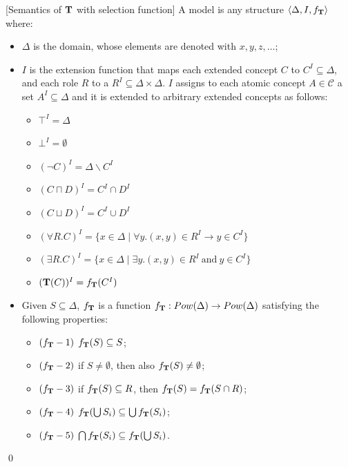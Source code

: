 \documentclass[a4paper, 11pt, oneside]{duthesis}
\newcommand{\tip}{{\bf T}}
\newcommand{\vuoto} {\emptyset}
\newcommand{\nott} {\lnot}
\newcommand{\tc} {\mid}
\newcommand{\imp} {\rightarrow}
\newenvironment{definition}
{\begin{defi} \rm}{\qed \end{defi}}
\newenvironment{definition}
{\begin{defi} \rm}{\qed \end{defi}}
\newtheorem{definition}{Definition}
\newcounter{posu}
\newtheorem{definition}[posu]{Definition}
\begin{document}
\begin{definition}[Semantics of $\tip$ with selection function]\label{Semantics with f_tip} A model is any structure $\langle \Delta, I, f_\tip \rangle$ where:

\begin{itemize}
\item $\Delta$ is the domain, whose elements are denoted with $x, y, z, \dots$;
\item $I$ is the extension function that maps each extended concept $C$ to $C^I \subseteq \Delta$, and each role $R$ to a $R^I \subseteq \Delta \times \Delta$.
$I$ assigns to each atomic concept $A \in \mathcal{C}$ a set $A^I \subseteq \Delta$ and it is extended to arbitrary extended concepts as follows:

\begin{itemize}
  \item $\top^I=\Delta$
  \item $\bot^I=\vuoto$
  \item $(\nott C)^I=\Delta \backslash C^I$
  \item $(C \sqcap D)^I=C^I \cap D^I$
  \item $(C \sqcup D)^I=C^I \cup D^I$
  \item $(\forall R.C)^I=\{x \in \Delta \tc \forall y. (x,y) \in R^I \imp y \in C^I\}$
  \item $(\exists R.C)^I=\{x \in \Delta \tc \exists y.(x,y) \in R^I \ \mbox{and} \ y \in C^I\}$
  \item $(\tip(C))^I = f_\tip(C^I)$
\end{itemize}


\item Given $S \subseteq \Delta$, $f_\tip$ is a function $f_\tip : Pow(\Delta) \rightarrow Pow(\Delta)$ satisfying the following properties:

\begin{itemize}
\item $(f_\tip-1)$ $f_\tip(S) \subseteq S$;
\item $(f_\tip-2)$ if $S \neq \emptyset$, then also $f_\tip(S)
\neq \emptyset$;
\item $(f_\tip-3)$ if $f_\tip(S) \subseteq R$, then $f_\tip(S) = f_\tip(S \cap R)$;
\item $(f_\tip-4)$ $f_\tip(\bigcup S_i ) \subseteq \bigcup f_\tip(S_i)$;
\item $(f_\tip-5)$ $\bigcap f_\tip(S_i) \subseteq  f_\tip(\bigcup S_i)$.
\end{itemize}

\end{itemize}

\end{definition}
\end{document}
